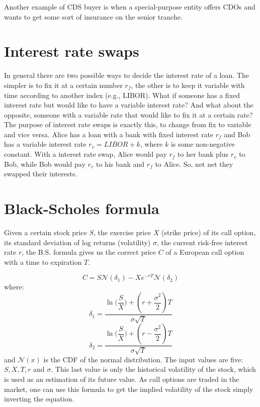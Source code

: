 Another example of CDS buyer is when a special-purpose entity offers CDOs and wants to get some sort of insurance on the senior tranche.

\section{Interest rate swaps}
In general there are two possible ways to decide the interest rate of a loan. The simpler is to fix it at a certain number $r_f$, the other is to keep it variable with time according to another index (e.g., LIBOR). What if someone has a fixed interest rate but would like to have a variable interest rate? And what about the opposite, someone with a variable rate that would like to fix it at a certain rate? The purpose of interest rate swaps is exactly this, to change from fix to variable and vice versa. Alice has a loan with a bank with fixed interest rate $r_f$ and Bob has a variable interest rate $r_v = LIBOR + k$, where $k$ is some non-negative constant. With a interest rate swap, Alice would pay $r_f$ to her bank plus $r_v$ to Bob, while Bob would pay $r_v$ to his bank and $r_f$ to Alice. So, net net they swapped their interests.


\section{Black-Scholes formula}
Given a certain stock price $S$, the exercise price $X$ (strike price) of its call option, its standard deviation of log returns (volatility) $\sigma$, the current risk-free interest rate $r$, the B.S. formula gives us the correct price $C$ of a European call option with a time to expiration $T$.

\begin{equation}
    \label{eq:BSformula}
    C = S \mathcal{N}(\delta_1) - X e^{-r T} \mathcal{N}(\delta_2)
\end{equation}
where:
\begin{equation}
    \delta_1 = \dfrac{\ln{\Big(\dfrac{S}{X}\Big)} + (r + \dfrac{\sigma^2}{2})T}{\sigma \sqrt{T}}
\end{equation}
\begin{equation}
    \delta_2 = \dfrac{\ln{\Big(\dfrac{S}{X}\Big)} + (r - \dfrac{\sigma^2}{2})T}{\sigma \sqrt{T}}
\end{equation}
and $\mathcal{N}(x)$ is the CDF of the normal distribution.
The input values are five: $S, X, T, r$ and $\sigma$. This last value is only the historical volatility of the stock, which is used as an estimation of its future value.
As call options are traded in the market, one can use this formula to get the implied volatility of the stock simply inverting the equation.

